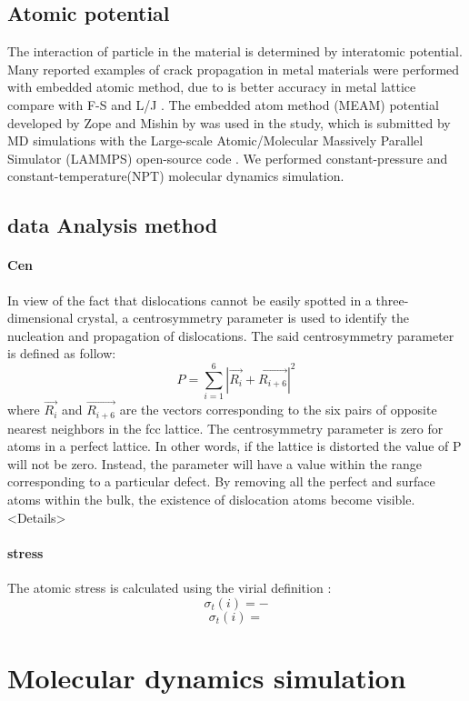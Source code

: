\documentclass[final,5p,times,twocolumn]{elsarticle}
\begin{document}
\subsection{Atomic potential}
The interaction of particle in the material is determined by interatomic potential. Many reported examples of crack propagation in metal materials were performed with embedded atomic method, due to is better accuracy in metal lattice compare with F-S and L/J \cite{}. The embedded atom method (MEAM) potential developed by Zope and Mishin by \cite{} was used in the study, which is submitted by MD simulations with the Large-scale Atomic/Molecular Massively Parallel Simulator (LAMMPS) open-source code \cite{}. We performed constant-pressure and constant-temperature(NPT) molecular dynamics simulation.

\subsection{data Analysis method}
\paragraph{Cen}
In view of the fact that dislocations cannot be easily spotted in a three-dimensional crystal, a centrosymmetry parameter \cite{} is used to identify the nucleation and propagation of dislocations. The said centrosymmetry parameter is defined as follow:
$$P = \displaystyle\sum_{i=1}^{6}|\vec{R_i}+\vec{R_{i+6}}|^2$$
where $\vec{R_i}$ and $\vec{R_{i+6}}$ are the vectors corresponding to the six pairs of opposite nearest neighbors in the fcc lattice. The centrosymmetry parameter is zero for atoms in a perfect lattice. In other words, if the lattice is distorted the value of P will not be zero. Instead, the parameter will have a value within the range corresponding to a particular defect. By removing all the perfect and surface atoms within the bulk, the existence of dislocation atoms become visible.<Details>
\paragraph{stress}
The atomic stress is calculated using the virial definition :
$$\sigma_t(i)=-$$
$$\sigma_t(i)= $$
\section{Molecular dynamics simulation}
\end{document}
